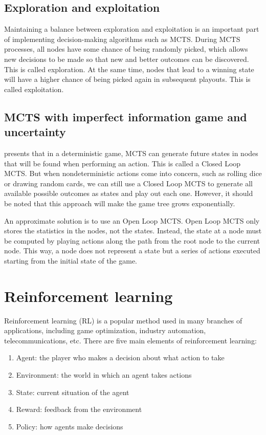 \subsection{Exploration and exploitation}
Maintaining a balance between exploration and exploitation is an important part of implementing decision-making algorithms such as MCTS. During MCTS processes, all nodes have some chance of being randomly picked, which allows new decisions to be made so that new and better outcomes can be discovered. This is called exploration. At the same time, nodes that lead to a winning state will have a higher chance of being picked again in subsequent \glspl{playout}. This is called exploitation.


\subsection{MCTS with imperfect information game and uncertainty}

\cite{Perez_Liebana_2015} presents that in a deterministic game, MCTS can generate future states in nodes that will be found when performing an action. This is called a Closed Loop MCTS. But when nondeterministic actions come into concern, such as rolling dice or drawing random cards, we can still use a Closed Loop MCTS to generate all available possible outcomes as states and play out each one. However, it should be noted that this approach will make the game tree grows exponentially. 

An approximate solution is to use an Open Loop MCTS. Open Loop MCTS only stores the statistics in the nodes, not the states. Instead, the state at a node must be computed by playing actions along the path from the root node to the current node. This way, a node does not represent a state but a series of actions executed starting from the initial state of the game.


\section{Reinforcement learning} %
Reinforcement learning (RL) is a popular method used in many branches of applications, including game optimization, industry automation, telecommunications, etc. There are five main elements of reinforcement learning:

\begin{enumerate}
  \item Agent: the player who makes a decision about what action to take
  \item Environment: the world in which an agent takes actions
  \item State: current situation of the agent
  \item Reward: feedback from the environment
  \item Policy: how agents make decisions
\end{enumerate}

